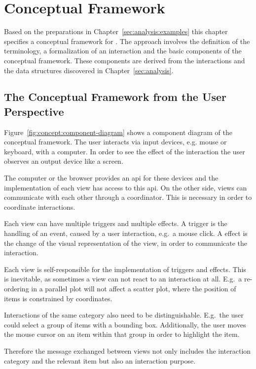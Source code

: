 \chapter{Conceptual Framework}\label{sec:concept}
Based on the preparations in Chapter~\ref{sec:analysis:examples} this chapter specifies a conceptual framework for \cmvs{}.
The approach involves the definition of the terminology, a formalization of an interaction and the basic components of the conceptual framework.
These components are derived from the interactions and the data structures discovered in Chapter~\ref{sec:analysis}.

\section{The Conceptual Framework from the User Perspective}\label{sec:concept:framework}

Figure~\ref{fig:concept:component-diagram} shows a component diagram of the conceptual framework.
The user interacts via input devices, e.g. mouse or keyboard, with a computer.
In order to see the effect of the interaction the user observes an output device like a screen.

The computer or the browser provides an \gls{api} for these devices and the implementation of each view has access to this \gls{api}.
On the other side, views can communicate with each other through a coordinator.
This is necessary in order to coordinate interactions.

Each view can have multiple triggers and multiple effects.
A trigger is the handling of an event, caused by a user interaction, e.g.\ a mouse click.
A effect is the change of the visual representation of the view, in order to communicate the interaction.

Each view is self-responsible for the implementation of triggers and effects.
This is inevitable, as sometimes a view can not react to an interaction at all.
E.g.\ a re-ordering in a parallel plot will not affect a scatter plot, where the position of items is constrained by coordinates.

Interactions of the same category also need to be distinguishable.
E.g.\ the user could select a group of items with a bounding box.
Additionally, the user moves the mouse cursor on an item within that group in order to highlight the item.

Therefore the message exchanged between views not only includes the interaction category and the relevant item but also an interaction purpose.

